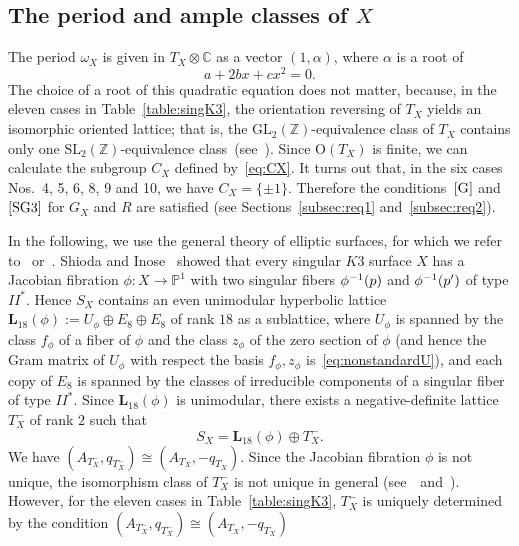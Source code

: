 \documentclass{amsart}
\theoremstyle{plain}
\theoremstyle{definition}
\theoremstyle{remark}
\newtheorem{remark}[theorem]{Remark}
\numberwithin{equation}{section}
\numberwithin{table}{section}
\numberwithin{figure}{section}
\newcommand{\C}{\mathord{\mathbb C}}
\renewcommand{\P}{\mathord{\mathbb  P}}
\newcommand{\Z}{\mathord{\mathbb Z}}
\newcommand{\tensor}{\otimes}
\newcommand{\inv}{\sp{-1}}
\newcommand{\sprime}{\sp\prime}
\newcommand{\GL}{\mathord{\mathrm {GL}}}
\newcommand{\OG}{\mathord{\mathrm {O}}}
\newcommand{\SL}{\mathord{\mathrm{SL}}}
\renewcommand{\L}{\mathord{\mathbf{L}}}
\newcommand{\propVG}{\mathord{\rm [G]}}
\newcommand{\assumpthree}{\mathord{\rm [SG3]}}
\begin{document}
\subsection{The period and ample classes of $X$}
%
%
The period $\omega_X$ is given in $T_X\tensor\C$ as a vector $(1, \alpha)$,
where $\alpha$ is a root of 
$$
a+2bx+cx^2=0.
$$
The choice of a root of this quadratic equation does not matter,
because,
in the eleven cases in Table~\ref{table:singK3},
the orientation reversing of $T_X$ yields an isomorphic oriented lattice;
that is,  the $\GL_2(\Z)$-equivalence class of $T_X$ 
contains only one $\SL_2(\Z)$-equivalence class~(see~\cite{MR1820211}).
Since $\OG(T_X)$ is finite,
we can calculate the subgroup $C_X$ defined by~\eqref{eq:CX}.
It turns out that,
in the six cases Nos.~{4, 5, 6, 8, 9 and 10},
we have $C_X=\{\pm 1\}$.
Therefore the conditions~$\propVG$ and $\assumpthree$
for $G_X$ and $R$ are satisfied (see Sections~\ref{subsec:req1} and~\ref{subsec:req2}).
%
%
%
\par
%
%
%
In the following, we use the general theory of elliptic surfaces,
for which we refer to~\cite{MR1081832} or~\cite{MR1813537}.
Shioda and Inose~\cite{MR0441982} showed that
every singular $K3$ surface $X$ has a Jacobian fibration $\phi\colon X\to\P^1$
with two singular fibers $\phi\inv(p)$ and $\phi\inv(p\sprime)$ of type $II^*$.
Hence $S_X$ contains an even unimodular hyperbolic lattice $\L_{18}(\phi):=U_{\phi}\oplus E_8\oplus E_8$
of rank $18$ as a sublattice, where $U_{\phi}$ is spanned by the class $f_{\phi}$ 
of a fiber of $\phi$ and the class $z_{\phi}$  of the zero section of $\phi$
(and hence the Gram matrix of $U_{\phi}$ with respect the basis $f_{\phi}, z_{\phi}$ is~\eqref{eq:nonstandardU}),
and each copy of $E_8$  is spanned by the classes of  irreducible components of 
a singular fiber of type $II^*$.
Since $\L_{18}(\phi)$ is unimodular,
there exists a negative-definite lattice $T_X^{-}$ of rank $2$ such that
$$
S_X=\L_{18}(\phi)\oplus T_X^{-}.
$$
We have $(A_{T_X^{-}}, q_{T_X^{-}})\cong(A_{T_X}, -q_{T_X})$.
Since the Jacobian fibration $\phi$ is not unique, 
the isomorphism class of $T_X^{-}$ is not unique 
in general (see~\cite{MR2346573}~and~\cite{MR2452829}). %
However, for the eleven cases in Table~\ref{table:singK3},
$T_X^{-}$ is uniquely determined  by the condition $(A_{T_X^{-}}, q_{T_X^{-}})\cong(A_{T_X}, -q_{T_X})$ 
\end{document}
